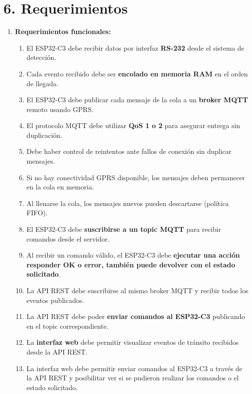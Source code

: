 \documentclass[
11pt, %
]{charter}
\begin{document}
\section{6. Requerimientos}
\label{sec:requerimientos}


\begin{enumerate}
	\item \textbf{Requerimientos funcionales:}
			\begin{enumerate}
			\item El ESP32-C3 debe recibir datos por interfaz \textbf{RS-232} desde el sistema de detección.
			\item  Cada evento recibido debe ser \textbf{encolado en memoria RAM} en el orden de llegada.
			\item  El ESP32-C3 debe publicar cada mensaje de la cola a un \textbf{broker MQTT} remoto usando GPRS.
			\item  El protocolo MQTT debe utilizar \textbf{QoS 1 o 2} para asegurar entrega sin duplicación.
			\item  Debe haber control de reintentos ante fallos de conexión sin duplicar mensajes.
			\item  Si no hay conectividad GPRS disponible, los mensajes deben permanecer en la cola en memoria.
			\item  Al llenarse la cola, los mensajes nuevos pueden descartarse (política FIFO).
			\item  El ESP32-C3 debe \textbf{suscribirse a un topic MQTT} para recibir comandos desde el servidor.
			\item  Al recibir un comando válido, el ESP32-C3 debe \textbf{ejecutar una acción responder OK o error, también puede devolver con el estado solicitado}.
			\item  La API REST debe suscribirse al mismo broker MQTT y recibir todos los eventos publicados.
			\item  La API REST debe poder \textbf{enviar comandos al ESP32-C3} publicando en el topic correspondiente.
			\item  La \textbf{interfaz web} debe permitir visualizar eventos de tránsito recibidos desde la API REST.
			\item  La interfaz web debe permitir enviar comandos al ESP32-C3 a través de la API REST y posibilitar ver si se pudieron realizar los comandos o el estado solicitado.
		\end{enumerate}
		

\end{enumerate}
\end{document}
